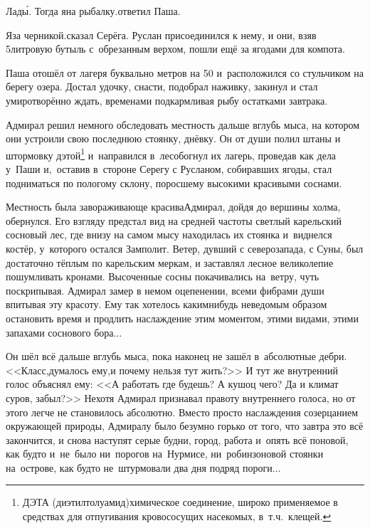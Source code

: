 \diagdash Лад\'{ы}. Тогда я\mdash на рыбалку.\mdash ответил Паша.

\diagdash Я\mdash за черникой.\mdash сказал Серёга. Руслан присоединился к нему, и они, взяв 5\sdash литровую бутыль с~обрезанным верхом, пошли ещё за ягодами для компота.

Паша отошёл от лагеря буквально метров на 50 и~расположился со стульчиком на берегу озера. Достал удочку, снасти, подобрал наживку, закинул и стал умиротворённо ждать, временами подкармливая рыбу остатками завтрака. %

Адмирал решил немного обследовать местность дальше вглубь мыса, на котором они устроили свою последнюю стоянку, днёвку. Он от души полил штаны и штормовку дэтой\footnote{ДЭТА (диэтилтолуамид)\mdash химическое соединение, широко применяемое в средствах для отпугивания кровососущих насекомых, в~т.ч.~клещей.} и~направился в~лес\mdash обогнул их лагерь, проведав как дела у~Паши и,~оставив в~стороне Серегу с Русланом, собиравших ягоды, стал подниматься по пологому склону, поросшему высокими красивыми соснами. 

Местность была завораживающе красива\mdash Адмирал, дойдя до вершины холма, обернулся. Его взгляду предстал вид на средней частоты светлый карельский сосновый лес, где внизу на самом мысу находилась их стоянка и~виднелся костёр, у~которого остался Замполит. Ветер, дувший с северо\sdash запада, с Суны, был достаточно тёплым по карельским меркам, и заставлял лесное великолепие пошумливать кронами. Высоченные сосны покачивались на~ветру, чуть поскрипывая. Адмирал замер в немом оцепенении, всеми фибрами души впитывая эту красоту. Ему так хотелось каким\sdash нибудь неведомым образом остановить время и продлить наслаждение этим моментом, этими видами, этими запахами соснового бора$\ldots$ 

Он шёл всё дальше вглубь мыса, пока наконец не зашёл в~абсолютные дебри. <<Класс,\mdash думалось ему,\mdash и почему нельзя тут жить?>> И тут же внутренний голос объяснял ему: <<А работать где будешь? А кушоц чего? Да и климат суров, забыл?>> Нехотя Адмирал признавал правоту внутреннего голоса, но от этого легче не становилось абсолютно. Вместо просто наслаждения созерцанием окружающей природы, Адмиралу было безумно горько от того, что завтра это всё закончится, и снова наступят серые будни, город, работа и~опять всё по\sdash новой, как будто и~не~было ни~порогов на~Нурмисе, ни~робинзоновой стоянки на~острове, как будто не~штурмовали два дня подряд пороги$\ldots$ 

